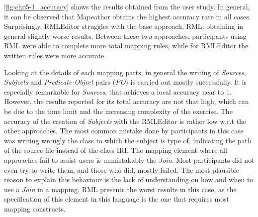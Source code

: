 \cref{fig:chp5-1_accuracy} shows the results obtained from the user study. In general, it can be observed that Mapeathor obtains the highest accuracy rate in all cases. Surprisingly, RMLEditor struggles with the base approach, RML, obtaining in general slightly worse results. Between these two approaches, participants using RML were able to complete more total mapping rules, while for RMLEditor the written rules were more accurate. 

Looking at the details of each mapping parts, in general the writing of \textit{Sources}, \textit{Subjects} and \textit{Predicate-Object} pairs (\textit{PO}) is carried out mostly successfully. It is especially remarkable for \textit{Sources}, that achieves a local accuracy near to 1. However, the results reported for its total accuracy are not that high, which can be due to the time limit and the increasing complexity of the exercise. The accuracy of the creation of \textit{Subjects} with the RMLEditor is rather low w.r.t the other approaches. The most common mistake done by participants in this case was writing wrongly the class to which the subject is type of, indicating the path of the source file instead of the class IRI. The mapping element where all approaches fail to assist users is unmistakably the \textit{Join}. Most participants did not even try to write them, and those who did, mostly failed. The most plausible reason to explain this behaviour is the lack of understanding on how and when to use a \textit{Join} in a mapping. RML presents the worst results in this case, as the specification of this element in this language is the one that requires most mapping constructs. 


